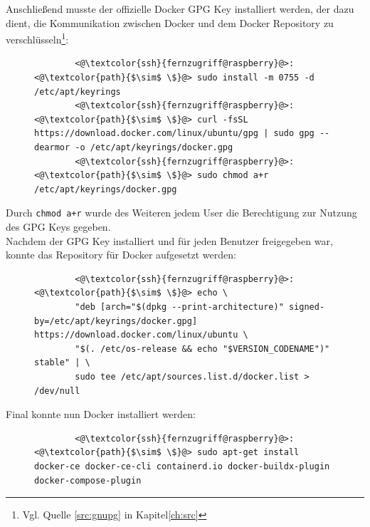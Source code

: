 \documentclass[a4paper, 11pt]{scrartcl}
\begin{document}
Anschließend musste der offizielle Docker GPG Key installiert werden, der dazu dient, die Kommunikation zwischen
Docker und dem Docker Repository zu verschlüsseln\footnote{Vgl. Quelle \ref{src:gnupg} in Kapitel\ref{ch:src}}:
\begin{figure}[H]
    \begin{mdframed}[backgroundcolor=bbg]
        \begin{lstlisting}
        <@\textcolor{ssh}{fernzugriff@raspberry}@>:<@\textcolor{path}{$\sim$ \$}@> sudo install -m 0755 -d /etc/apt/keyrings
        <@\textcolor{ssh}{fernzugriff@raspberry}@>:<@\textcolor{path}{$\sim$ \$}@> curl -fsSL https://download.docker.com/linux/ubuntu/gpg | sudo gpg --dearmor -o /etc/apt/keyrings/docker.gpg
        <@\textcolor{ssh}{fernzugriff@raspberry}@>:<@\textcolor{path}{$\sim$ \$}@> sudo chmod a+r /etc/apt/keyrings/docker.gpg
        \end{lstlisting}
    \end{mdframed}
    \label{lst:install_gpg}
\end{figure}
Durch \lstinline[basicstyle={\small\ttfamily\color{black}}]|chmod a+r| wurde des Weiteren jedem User die Berechtigung zur Nutzung des
GPG Keys gegeben.
\\
Nachdem der GPG Key installiert und für jeden Benutzer freigegeben war, konnte das Repository für Docker aufgesetzt werden:
\begin{figure}[H]
    \begin{mdframed}[backgroundcolor=bbg]
        \begin{lstlisting}
        <@\textcolor{ssh}{fernzugriff@raspberry}@>:<@\textcolor{path}{$\sim$ \$}@> echo \
        "deb [arch="$(dpkg --print-architecture)" signed-by=/etc/apt/keyrings/docker.gpg] https://download.docker.com/linux/ubuntu \
        "$(. /etc/os-release && echo "$VERSION_CODENAME")" stable" | \
        sudo tee /etc/apt/sources.list.d/docker.list > /dev/null
        \end{lstlisting}
    \end{mdframed}
    \label{lst:setup_docker_repo}
\end{figure}
Final konnte nun Docker installiert werden:
\begin{figure}[H]
    \begin{mdframed}[backgroundcolor=bbg]
        \begin{lstlisting}
        <@\textcolor{ssh}{fernzugriff@raspberry}@>:<@\textcolor{path}{$\sim$ \$}@> sudo apt-get install docker-ce docker-ce-cli containerd.io docker-buildx-plugin docker-compose-plugin
        \end{lstlisting}
    \end{mdframed}
    \label{lst:install_docker}
\end{figure}
\end{document}
